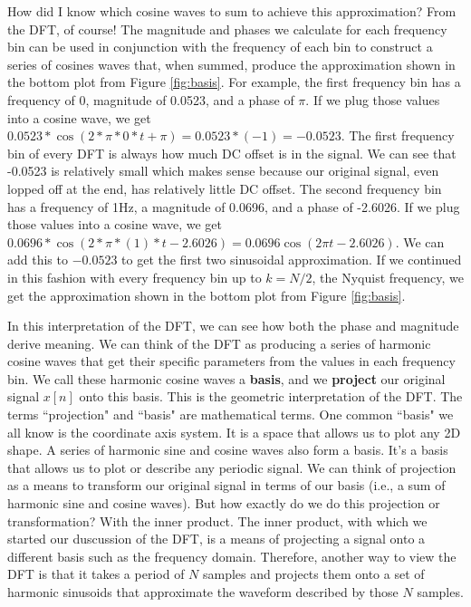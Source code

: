 How did I know which cosine waves to sum to achieve this approximation?  From the DFT, of course!
The magnitude and phases we calculate for each frequency bin
can be used in conjunction with the frequency of each bin to construct a series of cosines waves that,
when summed, produce the approximation shown in the bottom plot from Figure \ref{fig:basis}.  For example,
the first frequency bin has a frequency of 0, magnitude of 0.0523, and a phase of $\pi$.  If we plug those values 
into a cosine wave, we get $0.0523 * \cos(2 * \pi * 0 * t + \pi) = 0.0523 * (-1) = -0.0523$.  The first frequency bin
of every DFT is always how much DC offset is in the signal.  We can see that -0.0523 is relatively small which 
makes sense because our original signal, even lopped off at the end, has relatively little DC offset.  The second
 frequency bin has a frequency of 1Hz, a magnitude of 0.0696, and a phase of -2.6026.  If we plug those values into
 a cosine wave, we get $0.0696 * \cos(2 * \pi * (1) * t - 2.6026) = 0.0696\cos(2\pi t - 2.6026)$.  We can add this to
 $-0.0523$ to get the first two sinusoidal approximation.  If we continued in this fashion with every frequency bin
 up to $k = N/2$, the Nyquist frequency, we get the approximation shown in the bottom plot from 
 Figure \ref{fig:basis}.  
 
 	In this interpretation of the DFT, we can see how both the phase and magnitude derive meaning.  We can think
 of the DFT as producing a series of harmonic cosine waves that get their specific parameters from the values in each
frequency bin.  We call these harmonic cosine waves a \textbf{basis}, and we \textbf{project} our original signal
$x[n]$ onto this basis.  This is the geometric interpretation of the DFT.  The terms ``projection" and ``basis" are 
mathematical terms.  One common ``basis" we all know is the coordinate axis system.  It is a space that allows us
to plot any 2D shape.  A series of harmonic sine and cosine waves also form a basis.  It's a basis that allows us to 
plot or describe any periodic signal.  We can think of projection as a means to transform our original signal
 in terms of our basis (i.e., a sum of harmonic sine and cosine waves).  But how exactly do we do this projection
 or transformation?  With the inner product.  The inner product, with which we started our duscussion of the DFT,
 is a means of projecting a signal onto a different basis such as the frequency domain.  Therefore, another way to
 view the DFT is that it takes a period of $N$ samples and projects them onto a set of harmonic sinusoids that
 approximate the waveform described by those $N$ samples.
